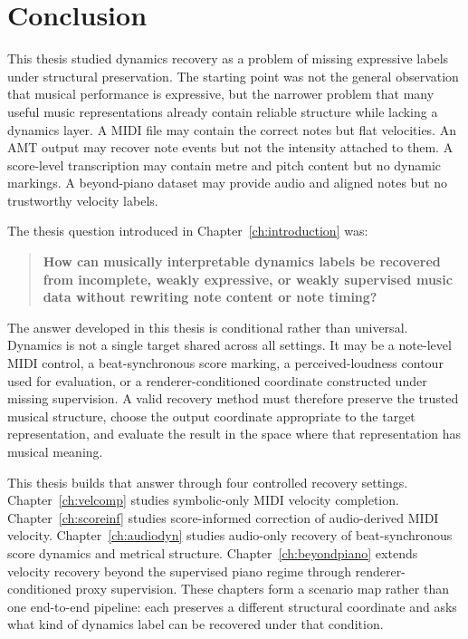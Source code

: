 \chapter{Conclusion}
\label{ch:conclusion}

This thesis studied dynamics recovery as a problem of missing expressive labels under structural preservation. The starting point was not the general observation that musical performance is expressive, but the narrower problem that many useful music representations already contain reliable structure while lacking a dynamics layer. A MIDI file may contain the correct notes but flat velocities. An AMT output may recover note events but not the intensity attached to them. A score-level transcription may contain metre and pitch content but no dynamic markings. A beyond-piano dataset may provide audio and aligned notes but no trustworthy velocity labels.

The thesis question introduced in Chapter~\ref{ch:introduction} was:
\begin{quote}
\textbf{How can musically interpretable dynamics labels be recovered from incomplete, weakly expressive, or weakly supervised music data without rewriting note content or note timing?}
\end{quote}

The answer developed in this thesis is conditional rather than universal. Dynamics is not a single target shared across all settings. It may be a note-level MIDI control, a beat-synchronous score marking, a perceived-loudness contour used for evaluation, or a renderer-conditioned coordinate constructed under missing supervision. A valid recovery method must therefore preserve the trusted musical structure, choose the output coordinate appropriate to the target representation, and evaluate the result in the space where that representation has musical meaning.

This thesis builds that answer through four controlled recovery settings. Chapter~\ref{ch:velcomp} studies symbolic-only MIDI velocity completion. Chapter~\ref{ch:scoreinf} studies score-informed correction of audio-derived MIDI velocity. Chapter~\ref{ch:audiodyn} studies audio-only recovery of beat-synchronous score dynamics and metrical structure. Chapter~\ref{ch:beyondpiano} extends velocity recovery beyond the supervised piano regime through renderer-conditioned proxy supervision. These chapters form a scenario map rather than one end-to-end pipeline: each preserves a different structural coordinate and asks what kind of dynamics label can be recovered under that condition.

